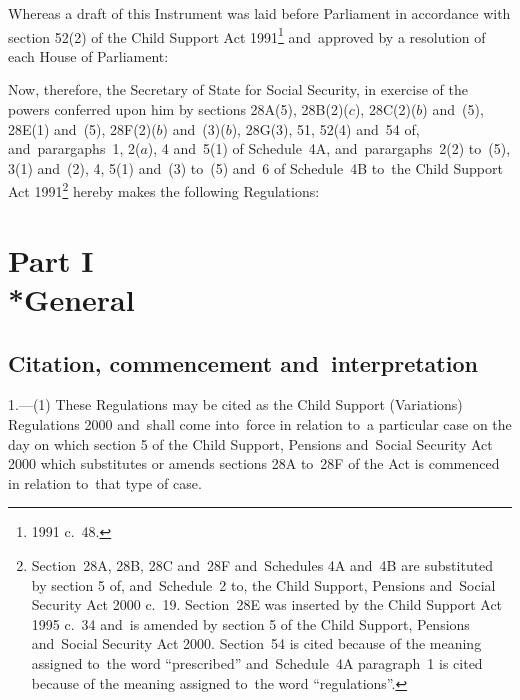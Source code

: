 \documentclass[12pt,a4paper]{article}
\title{\regstitle}
\author{S.I.\ 2001 No.\ 156}
\date{Made
18th January 2001\\
Coming into~force
as provided in regulation~1(1)
}
\begin{document}
\maketitle

\noindent
Whereas a draft of this Instrument was laid before Parliament in accordance with section 52(2) of the Child Support Act 1991\footnote{1991 c.\ 48.} and~approved by a resolution of each House of Parliament:

Now, therefore, the Secretary of State for Social Security, in exercise of the powers conferred upon him by sections 28A(5), 28B(2)($c$), 28C(2)($b$)  and~(5), 28E(1) and~(5), 28F(2)($b$)  and~(3)($b$), 28G(3), 51, 52(4) and~54 of, and~parargaphs~1, 2($a$), 4 and~5(1) of Schedule~4A, and~parargaphs~2(2) to~(5), 3(1) and~(2), 4, 5(1) and~(3) to~(5) and~6 of Schedule~4B to~the Child Support Act 1991\footnote{Section~28A, 28B, 28C and~28F and~Schedules 4A and~4B are substituted by section 5 of, and~Schedule~2 to, the Child Support, Pensions and~Social Security Act 2000 c.\ 19. Section~28E was inserted by the Child Support Act 1995 c.\ 34 and~is amended by section 5 of the Child Support, Pensions and~Social Security Act 2000. Section~54 is cited because of the meaning assigned to~the word “prescribed” and~Schedule~4A paragraph~1 is cited because of the meaning assigned to~the word “regulations”.} hereby makes the following Regulations: 

{\sloppy

\tableofcontents

}

\bigskip

\setcounter{secnumdepth}{-2}

\section[Part I --- General]{Part I\\*General}

\renewcommand\parthead{--- Part I}

\subsection[1. Citation, commencement and~interpretation]{Citation, commencement and~interpretation}

1.---(1)  These Regulations may be cited as the Child Support (Variations) Regulations 2000 and~shall come into~force in relation to~a particular case on the day on which section 5 of the Child Support, Pensions and~Social Security Act 2000 which substitutes or amends sections 28A to~28F of the Act is commenced in relation to~that type of case.
\end{document}
